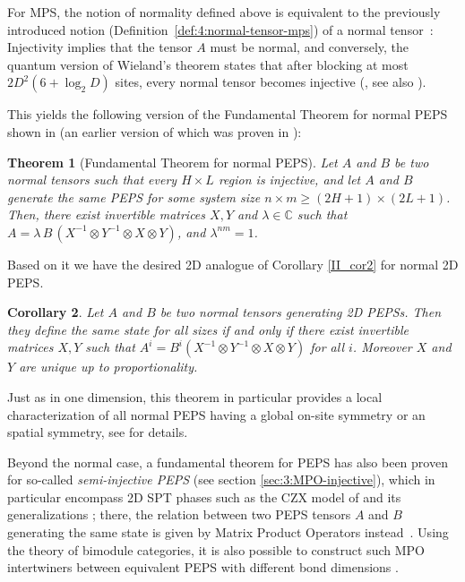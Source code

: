 \documentclass[rmp,aps,reprint,superscriptaddress,nobalancelastpage]{revtex4-1}
\newtheorem{thm}{Theorem}[section]
\newtheorem{cor}[thm]{Corollary}
\begin{document}
    For MPS, the notion of normality defined above is equivalent to the previously introduced notion (Definition~\ref{def:4:normal-tensor-mps})
    of a normal tensor~\cite{sanz:wielandt}:
    Injectivity implies  that the tensor $A$ must be normal, and conversely, the quantum version of Wieland's theorem states that after blocking at most
$2D^2(6+\log_2D)$ sites, every normal tensor becomes injective (\textcite{michalek:wielandt-Dsquare}, see also \textcite{perez-garcia:inj-peps-syms,rahaman:wielandt-Dsquare}).



    This yields the following version of the Fundamental Theorem for normal PEPS shown in \textcite{molnar:normal-peps-fundamentalthm} (an earlier version of which was proven in \textcite{perez-garcia:inj-peps-syms}):

    \begin{thm}[Fundamental Theorem for normal PEPS]
        \label{thm:canonical-2D}
        Let $A$ and $B$ be two normal tensors such that every $H\times L$ region is injective, and let $A$ and $B$ generate the same PEPS for some system size $n\times m\ge (2H+1)\times (2L+1)$. Then,
        there exist invertible matrices $X,Y$ and $\lambda \in \mathbb{C}$ such that
        $A=\lambda\, B\,(X^{-1}\otimes Y^{-1} \otimes X\otimes Y)$, and $\lambda^{nm}=1$.
    \end{thm}

    Based on it we have the desired 2D analogue of Corollary \ref{II_cor2} for normal 2D PEPS.

    \begin{cor}
        Let $A$ and $B$ be two normal tensors generating 2D PEPSs. Then they define the same state for all sizes if and only if there exist invertible matrices $X,Y$ such that $ A^i= B^i(X^{-1}\otimes Y^{-1} \otimes X\otimes Y)$ for all $i$. Moreover $X$ and $Y$ are unique up to proportionality.
    \end{cor}

    Just as in one dimension, this theorem in particular provides a local characterization of all normal PEPS having a global on-site symmetry or an spatial symmetry, see \textcite{perez-garcia:inj-peps-syms} for details.

    Beyond the normal case, a fundamental theorem for PEPS has also been proven for so-called \emph{semi-injective PEPS} (see section \ref{sec:3:MPO-injective}), which in particular encompass 2D SPT phases such as the CZX model of \textcite{chen:2d-spt-phases-peps-ghz} and its generalizations \cite{chen:spt-order-and-cohomology,williamson:mpo-spt}; there, the relation between two PEPS tensors $A$ and $B$ generating the same state is given by Matrix Product Operators instead~\cite{molnar:quasi-injective-peps}. Using the theory of bimodule categories, it is also possible to construct such MPO intertwiners between equivalent PEPS with different bond dimensions \cite{lootens2020matrix}.
\end{document}
